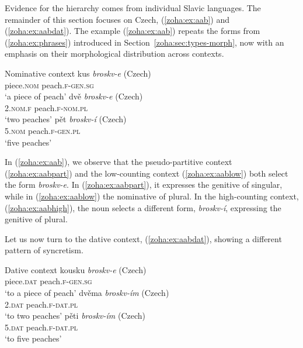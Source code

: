 \documentclass[output=paper,colorlinks,citecolor=brown
]{langscibook}
\begin{document}
Evidence for the hierarchy comes from individual Slavic languages. The remainder of this section focuses on Czech, (\ref{zoha:ex:aab}) and (\ref{zoha:ex:aabdat}). The example (\ref{zoha:ex:aab}) repeats the forms from (\ref{zoha:ex:phrases}) introduced in Section~\ref{zoha:sec:types-morph}, now with an emphasis on their morphological distribution across contexts.

\ea Nominative context \label{zoha:ex:aab}
    \ea \gll kus  \textit{broskv-e} (Czech)\\
    piece.\textsc{nom} peach.\textsc{f}-\textsc{gen.sg}\\
    \glt `a piece of peach' \label{zoha:ex:aabpart}
    \ex \gll dvě  \textit{broskv-e} (Czech)\\
    2.\textsc{nom.f} peach.\textsc{f}-\textsc{nom.pl}\\
    \glt `two peaches' \label{zoha:ex:aablow}
    \ex \gll pět  \textit{broskv-í} (Czech)\\
    5.\textsc{nom} peach.\textsc{f}-\textsc{gen.pl}\\
    \glt `five peaches' \label{zoha:ex:aabhigh}
    \z
\z

\noindent In (\ref{zoha:ex:aab}), we observe that the pseudo-partitive context (\ref{zoha:ex:aabpart}) and the low-counting context (\ref{zoha:ex:aablow}) both select the form \textit{broskv-e}. In (\ref{zoha:ex:aabpart}), it expresses the genitive of singular, while in (\ref{zoha:ex:aablow}) the nominative of plural. In the high-counting context, (\ref{zoha:ex:aabhigh}), the noun selects a different form, \textit{broskv-í}, expressing the genitive of plural.

Let us now turn to the dative context, (\ref{zoha:ex:aabdat}), showing a different pattern of syncretism.

\ea Dative context \label{zoha:ex:aabdat}
    \ea \gll kousku  \textit{broskv-e} (Czech)\\
    piece.\textsc{dat} peach.\textsc{f}-\textsc{gen.sg}\\
    \glt ‘to a piece of peach’ \label{zoha:ex:aabdatpart}
    \ex \gll dvěma \textit{broskv-ím} (Czech)\\
    2.\textsc{dat} peach.\textsc{f}-\textsc{dat.pl}\\
    \glt ‘to two peaches’ \label{zoha:ex:aabdatlow}
    \ex \gll pěti \textit{broskv-ím} (Czech)\\
    5.\textsc{dat} peach.\textsc{f}-\textsc{dat.pl}\\
    \glt ‘to five peaches’ \label{zoha:ex:aabdathigh}
    \z
\z
\end{document}
